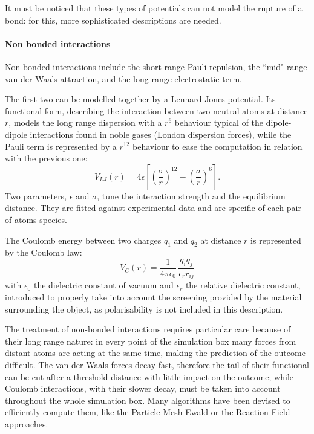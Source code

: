 It must be noticed that these types of potentials can not model the rupture of a bond: for this, more sophisticated descriptions are needed.


\paragraph{Non bonded interactions}
Non bonded interactions include the short range Pauli repulsion, the ``mid"-range van der Waals attraction, and the long range electrostatic term.

The first two can be modelled together by a Lennard-Jones potential. Its functional form, describing the interaction between two neutral atoms at distance $r$, models the long range dispersion with a $r^6$ behaviour typical of the dipole-dipole interactions found in noble gases (London dispersion forces), while the Pauli term is represented by a $r^{12}$ behaviour to ease the computation in relation with the previous one:
\begin{equation}
V_{LJ}(r) = 4 \epsilon \left[ \left( \frac{\sigma}{r} \right)^{12} - \left( \frac{\sigma}{r} \right)^6 \right].
\end{equation}
Two parameters, $\epsilon$ and $\sigma$, tune the interaction strength and the equilibrium distance. They are fitted against experimental data and are specific of each pair of atoms species.

The Coulomb energy between two charges $q_1$ and $q_2$ at distance $r$ is represented by the Coulomb law:
\begin{equation}
V_C(r) = \frac{1}{4 \pi \epsilon_0} \, \frac{q_i q_j}{\epsilon_r r_{ij}}
\end{equation}
with $\epsilon_0$ the dielectric constant of vacuum and $\epsilon_r$ the relative dielectric constant, introduced to properly take into account the screening provided by the material surrounding the object, as polarisability is not included in this description.

The treatment of non-bonded interactions requires particular care because of their long range nature: in every point of the simulation box many forces from distant atoms are acting at the same time, making the prediction of the outcome difficult.
%
The van der Waals forces decay fast, therefore the tail of their functional can be cut after a threshold distance with little impact on the outcome; while Coulomb interactions, with their slower decay, must be taken into account throughout the whole simulation box. Many algorithms have been devised to efficiently compute them, like the Particle Mesh Ewald \citep{Essmann1995} or the Reaction Field \citep{Tironi1995} approaches. 


